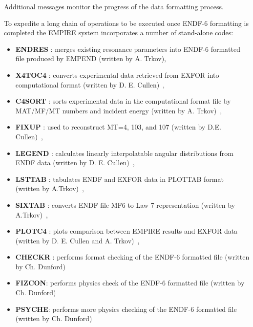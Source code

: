 Additional messages monitor the progress of the data formatting process.

To expedite a long chain of operations to be executed once ENDF-6 formatting
is completed the EMPIRE system incorporates a number of stand-alone codes:

\begin{itemize}
\item \textbf{ENDRES%
}: merges existing resonance parameters into ENDF-6 formatted
file produced by EMPEND (written by A. Trkov),

\item \textbf{X4TOC4%
}: converts experimental data retrieved from EXFOR into
computational format (written by D. E. Cullen)~\cite{PREPRO},

\item \textbf{C4SORT%
}: sorts experimental data in the computational format file by
MAT/MF/MT numbers and incident energy (written by A. Trkov)~\cite{ENDVER},

\item \textbf{FIXUP%
}: used to reconstruct MT=4, 103, and 107 (written by D.E.
Cullen)~\cite{PREPRO},

\item \textbf{LEGEND%
}: calculates linearly interpolatable angular distributions
from ENDF data (written by D. E. Cullen)~\cite{PREPRO},

\item \textbf{LSTTAB%
}: tabulates ENDF and EXFOR data in PLOTTAB format (written by
A.Trkov)~\cite{ENDVER},

\item \textbf{SIXTAB%
}: converts ENDF file MF6 to Law 7 representation (written by
A.Trkov)~\cite{ENDVER},

\item \textbf{PLOTC4%
}: plots comparison between EMPIRE results and EXFOR data
(written by D. E. Cullen and A. Trkov)~\cite{ENDVER},

\item \textbf{CHECKR%
}: performs format checking of the ENDF-6 formatted file
(written by Ch. Dunford)

\item \textbf{FIZCON}: performs physics check of the ENDF-6 formatted file
(written by Ch. Dunford)

\item \textbf{PSYCHE}: performs more physics checking of the ENDF-6
formatted file (written by Ch. Dunford)


\end{itemize}
